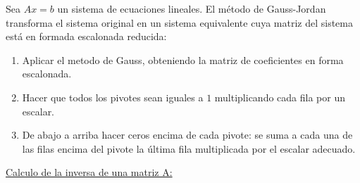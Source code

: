 \begin{proposition}
	Sea \(Ax = b \) un sistema de ecuaciones lineales. El método de Gauss-Jordan transforma el sistema original en un sistema equivalente cuya matriz del sistema está en formada escalonada reducida:
	\begin{enumerate}
		\item Aplicar el metodo de Gauss, obteniendo la matriz de coeficientes en forma escalonada.
		\item Hacer que todos los pivotes sean iguales a \(1 \) multiplicando cada fila por un escalar.
		\item De abajo a arriba hacer ceros encima de cada pivote: se suma a cada una de las filas encima del pivote la última fila multiplicada por el escalar adecuado.
	\end{enumerate}
\end{proposition}

\underline{Calculo de la inversa de una matriz A:}

